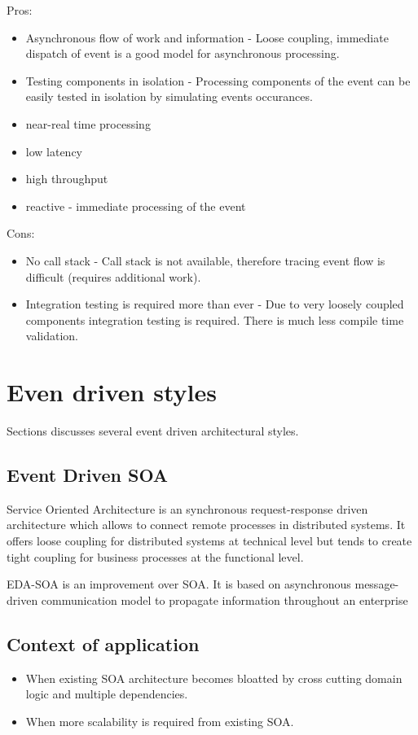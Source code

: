 \documentclass[12pt, a4paper]{article}
\begin{document}
Pros:
\begin{itemize}
\item Asynchronous flow of work and information - Loose coupling, immediate dispatch of event is a good model for asynchronous processing.
\item Testing components in isolation - Processing components of the event can be easily tested in isolation by simulating events occurances.
\item near-real time processing
\item low latency
\item high throughput
\item reactive - immediate processing of the event
\end{itemize}

Cons:
\begin{itemize}
\item No call stack - Call stack is not available, therefore tracing event flow is difficult (requires additional work).
\item Integration testing is required more than ever - Due to very loosely coupled components integration testing is required. There is much less compile time validation.
\end{itemize}

\section{Even driven styles}
Sections discusses several event driven architectural styles.

\subsection{Event Driven SOA}
Service Oriented Architecture is an synchronous request-response driven architecture which allows to connect remote processes in distributed systems. It offers loose coupling for distributed systems at technical level but tends to create tight coupling for business processes at the functional level.

EDA-SOA is an improvement over SOA. It is based on asynchronous message-driven communication model to propagate information throughout an enterprise

\subsection{Context of application}
\begin{itemize}
\item When existing SOA architecture becomes bloatted by cross cutting domain logic and multiple dependencies.
\item When more scalability is required from existing SOA.
\end{itemize}
\end{document}
